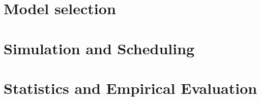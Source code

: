 
 



\section{Model selection}


\section{Simulation and Scheduling}


\section{Statistics and Empirical Evaluation}


